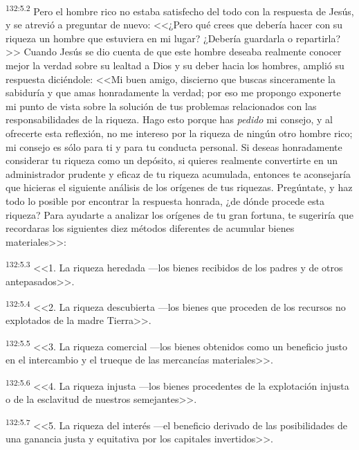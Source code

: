 \par 
\textsuperscript{132:5.2} Pero el hombre rico no estaba satisfecho del todo con la respuesta de Jesús, y se atrevió a preguntar de nuevo: <<¿Pero qué crees que debería hacer con su riqueza un hombre que estuviera en mi lugar? ¿Debería guardarla o repartirla?>> Cuando Jesús se dio cuenta de que este hombre deseaba realmente conocer mejor la verdad sobre su lealtad a Dios y su deber hacia los hombres, amplió su respuesta diciéndole: <<Mi buen amigo, discierno que buscas sinceramente la sabiduría y que amas honradamente la verdad; por eso me propongo exponerte mi punto de vista sobre la solución de tus problemas relacionados con las responsabilidades de la riqueza. Hago esto porque has \textit{pedido} mi consejo, y al ofrecerte esta reflexión, no me intereso por la riqueza de ningún otro hombre rico; mi consejo es sólo para ti y para tu conducta personal. Si deseas honradamente considerar tu riqueza como un depósito, si quieres realmente convertirte en un administrador prudente y eficaz de tu riqueza acumulada, entonces te aconsejaría que hicieras el siguiente análisis de los orígenes de tus riquezas. Pregúntate, y haz todo lo posible por encontrar la respuesta honrada, ¿de dónde procede esta riqueza? Para ayudarte a analizar los orígenes de tu gran fortuna, te sugeriría que recordaras los siguientes diez métodos diferentes de acumular bienes materiales>>:

\par 
\textsuperscript{132:5.3} <<1. La riqueza heredada ---los bienes recibidos de los padres y de otros antepasados>>.

\par 
\textsuperscript{132:5.4} <<2. La riqueza descubierta ---los bienes que proceden de los recursos no explotados de la madre Tierra>>.

\par 
\textsuperscript{132:5.5} <<3. La riqueza comercial ---los bienes obtenidos como un beneficio justo en el intercambio y el trueque de las mercancías materiales>>.

\par 
\textsuperscript{132:5.6} <<4. La riqueza injusta ---los bienes procedentes de la explotación injusta o de la esclavitud de nuestros semejantes>>.

\par 
\textsuperscript{132:5.7} <<5. La riqueza del interés ---el beneficio derivado de las posibilidades de una ganancia justa y equitativa por los capitales invertidos>>.

